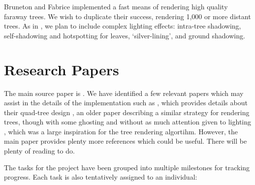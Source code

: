 \documentclass{article}
\begin{document}
Bruneton and Fabrice \cite{trees} implemented a fast means of rendering high quality faraway trees.  We wish to duplicate their success, rendering 1,000 or more distant trees.  As in \cite{trees}, we plan to include complex lighting effects: intra-tree shadowing, self-shadowing and hotspotting for leaves, ‘silver-lining’, and ground shadowing.

\section{Research Papers}
The main source paper is \cite{trees}. We have identified a few relevant papers which may assist in the details of the implementation such as 
\cite{vecterrain}, which provides details about their quad-tree design \cite{treeszbuf}, an older paper describing a similar strategy for rendering trees, though with some ghosting and without as much attention given to lighting \cite{fastlightfield}, which was a large inspiration for the tree rendering algortihm.  However, the main paper provides plenty more references which could be useful. There will be plenty of reading to do.

The tasks for the project have been grouped into multiple milestones for tracking progress.  Each task is also tentatively assigned to an individual:
\end{document}

